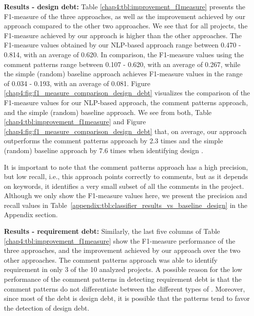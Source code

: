 \vspace{1mm}

\noindent \textbf{Results - design debt:} Table \ref{chap4:tbl:improvement_f1measure} presents the F1-measure of the three approaches, as well as the improvement achieved by our approach compared to the other two approaches. We see that for all projects, the F1-measure achieved by our approach is higher than the other approaches. The F1-measure values obtained by our NLP-based approach range between 0.470 - 0.814, with an average of 0.620. In comparison, the F1-measure values using the comment patterns range between 0.107 - 0.620, with an average of 0.267, while the simple (random) baseline approach achieves F1-measure values in the range of 0.034 - 0.193, with an average of 0.081. Figure \ref{chap4:fig:f1_measure_comparison_design_debt} visualizes the comparison of the F1-measure values for our NLP-based approach, the comment patterns approach, and the simple (random) baseline approach. We see from both, Table \ref{chap4:tbl:improvement_f1measure} and Figure \ref{chap4:fig:f1_measure_comparison_design_debt} that, on average, our approach outperforms the comment patterns approach by 2.3 times and the simple (random) baseline approach by 7.6 times when identifying design \SATD.

It is important to note that the comment patterns approach has a high precision, but low recall, i.e., this approach points correctly to \SATD comments, but as it depends on keywords, it identifies a very small subset of all the \SATD comments in the project. Although we only show the F1-measure values here, we present the precision and recall values in Table~\ref{appendix:tbl:classifier_results_vs_baseline_design} in the Appendix section.  

\noindent \textbf{Results - requirement debt:} Similarly, the last five columns of Table \ref{chap4:tbl:improvement_f1measure} show the F1-measure performance of the three approaches, and the improvement achieved by our approach over the two other approaches. The comment patterns approach was able to identify requirement \SATD in only 3 of the 10 analyzed projects. A possible reason for the low performance of the comment patterns in detecting requirement debt is that the comment patterns do not differentiate between the different types of \SATD. Moreover, since most of the debt is design debt, it is possible that the patterns tend to favor the detection of design debt.
 
